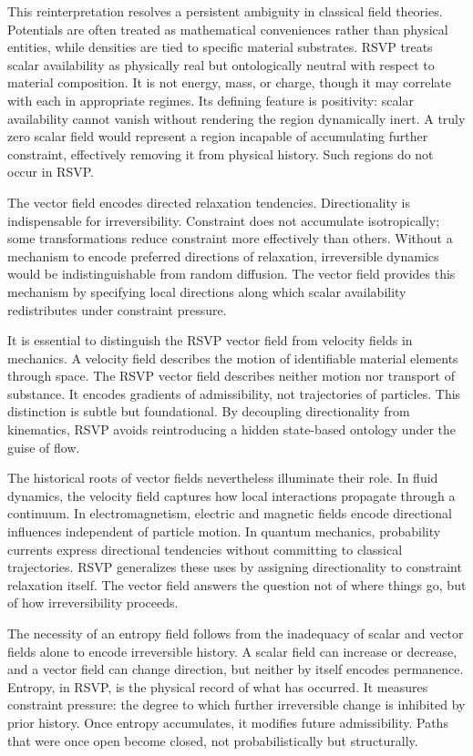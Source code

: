 \documentclass[11pt,oneside]{book}
\begin{document}
This reinterpretation resolves a persistent ambiguity in classical field theories. Potentials are often treated as mathematical conveniences rather than physical entities, while densities are tied to specific material substrates. RSVP treats scalar availability as physically real but ontologically neutral with respect to material composition. It is not energy, mass, or charge, though it may correlate with each in appropriate regimes. Its defining feature is positivity: scalar availability cannot vanish without rendering the region dynamically inert. A truly zero scalar field would represent a region incapable of accumulating further constraint, effectively removing it from physical history. Such regions do not occur in RSVP.

The vector field encodes directed relaxation tendencies. Directionality is indispensable for irreversibility. Constraint does not accumulate isotropically; some transformations reduce constraint more effectively than others. Without a mechanism to encode preferred directions of relaxation, irreversible dynamics would be indistinguishable from random diffusion. The vector field provides this mechanism by specifying local directions along which scalar availability redistributes under constraint pressure.

It is essential to distinguish the RSVP vector field from velocity fields in mechanics. A velocity field describes the motion of identifiable material elements through space. The RSVP vector field describes neither motion nor transport of substance. It encodes gradients of admissibility, not trajectories of particles. This distinction is subtle but foundational. By decoupling directionality from kinematics, RSVP avoids reintroducing a hidden state-based ontology under the guise of flow.

The historical roots of vector fields nevertheless illuminate their role. In fluid dynamics, the velocity field captures how local interactions propagate through a continuum. In electromagnetism, electric and magnetic fields encode directional influences independent of particle motion. In quantum mechanics, probability currents express directional tendencies without committing to classical trajectories. RSVP generalizes these uses by assigning directionality to constraint relaxation itself. The vector field answers the question not of where things go, but of how irreversibility proceeds.

The necessity of an entropy field follows from the inadequacy of scalar and vector fields alone to encode irreversible history. A scalar field can increase or decrease, and a vector field can change direction, but neither by itself encodes permanence. Entropy, in RSVP, is the physical record of what has occurred. It measures constraint pressure: the degree to which further irreversible change is inhibited by prior history. Once entropy accumulates, it modifies future admissibility. Paths that were once open become closed, not probabilistically but structurally.
\end{document}
